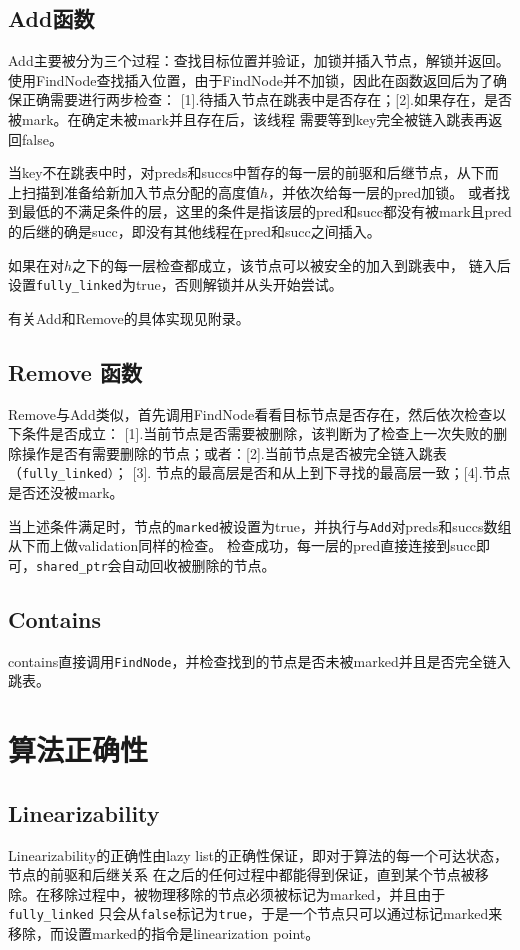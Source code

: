 \documentclass[UTF8, 10pt, twocolumn]{article}
\begin{document}
\subsection{Add函数}
Add主要被分为三个过程：查找目标位置并验证，加锁并插入节点，解锁并返回。
使用FindNode查找插入位置，由于FindNode并不加锁，因此在函数返回后为了确保正确需要进行两步检查：
[1].待插入节点在跳表中是否存在；[2].如果存在，是否被mark。在确定未被mark并且存在后，该线程
需要等到key完全被链入跳表再返回false。

当key不在跳表中时，对preds和succs中暂存的每一层的前驱和后继节点，从下而上扫描到准备给新加入节点分配的高度值$h$，并依次给每一层的pred加锁。
或者找到最低的不满足条件的层，这里的条件是指该层的pred和succ都没有被mark且pred的后继的确是succ，即没有其他线程在pred和succ之间插入。

如果在对$h$之下的每一层检查都成立，该节点可以被安全的加入到跳表中，
链入后设置\verb|fully_linked|为true，否则解锁并从头开始尝试。

有关Add和Remove的具体实现见附录。

\subsection{Remove 函数}
Remove与Add类似，首先调用FindNode看看目标节点是否存在，然后依次检查以下条件是否成立：
[1].当前节点是否需要被删除，该判断为了检查上一次失败的删除操作是否有需要删除的节点；或者：[2].当前节点是否被完全链入跳表（\verb|fully_linked）|；
[3]. 节点的最高层是否和从上到下寻找的最高层一致；[4].节点是否还没被mark。

当上述条件满足时，节点的\verb|marked|被设置为true，并执行与\verb|Add|对preds和succs数组从下而上做validation同样的检查。
检查成功，每一层的pred直接连接到succ即可，\verb|shared_ptr|会自动回收被删除的节点。

\subsection{Contains}
contains直接调用\verb|FindNode|，并检查找到的节点是否未被marked并且是否完全链入跳表。

\section{算法正确性}
\subsection{Linearizability}
Linearizability的正确性由lazy list\cite{pugh_skip_1990}的正确性保证，即对于算法的每一个可达状态，节点的前驱和后继关系
在之后的任何过程中都能得到保证，直到某个节点被移除。在移除过程中，被物理移除的节点必须被标记为marked，并且由于\verb|fully_linked|
只会从\verb|false|标记为\verb|true|，于是一个节点只可以通过标记marked来移除，而设置marked的指令是linearization point。
\end{document}

